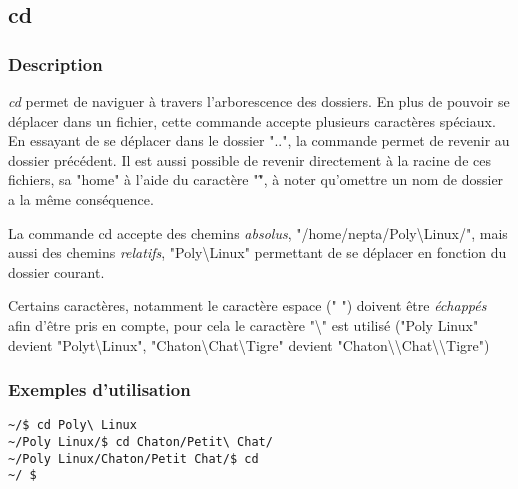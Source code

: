 \subsection*{cd}
\subsubsection*{Description}
\emph{cd} permet de naviguer à travers l'arborescence des dossiers.
En plus de pouvoir se déplacer dans un fichier, cette commande accepte plusieurs caractères spéciaux.
En essayant de se déplacer dans le dossier "..", la commande permet de revenir au dossier précédent.
Il est aussi possible de revenir directement à la racine de ces fichiers, sa "home" à l'aide du caractère "\~", à noter qu'omettre un nom de dossier a la même conséquence.

La commande cd accepte des chemins \emph{absolus}, "/home/nepta/Poly\textbackslash Linux/", mais aussi des chemins \emph{relatifs}, "Poly\textbackslash \textvisiblespace Linux" permettant de se déplacer en fonction du dossier courant.

Certains caractères, notamment le caractère espace (" ") doivent être \emph{échappés} afin d'être pris en compte, pour cela le caractère "\textbackslash" est utilisé ("Poly Linux" devient "Polyt\textbackslash Linux",
"Chaton\textbackslash Chat\textbackslash Tigre" devient "Chaton\textbackslash \textbackslash Chat\textbackslash \textbackslash Tigre")

\subsubsection*{Exemples d'utilisation}

\begin{lstlisting}
~/$ cd Poly\ Linux
~/Poly Linux/$ cd Chaton/Petit\ Chat/
~/Poly Linux/Chaton/Petit Chat/$ cd
~/ $ 
\end{lstlisting}
